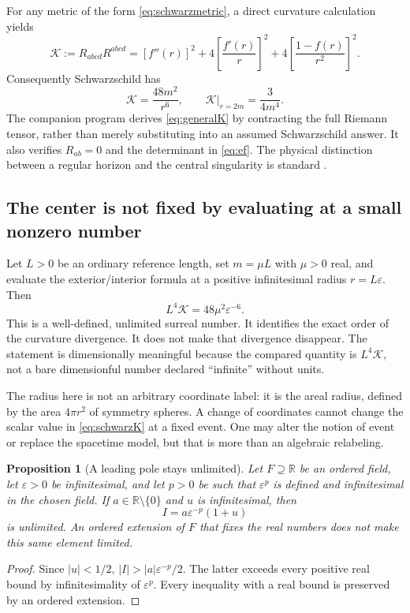 \documentclass[11pt,letterpaper]{article}
\newcommand{\R}{\mathbb{R}}
\newcommand{\eps}{\varepsilon}
\newcommand{\Kretsch}{\mathcal K}
\newtheorem{proposition}{Proposition}[section]
\theoremstyle{definition}
\theoremstyle{remark}
\begin{document}
For any metric of the form \eqref{eq:schwarzmetric}, a direct curvature
calculation yields
\begin{equation}
 \Kretsch:=R_{abcd}R^{abcd}
   =[f''(r)]^2+4\left[\frac{f'(r)}r\right]^2
       +4\left[\frac{1-f(r)}{r^2}\right]^2.
 \label{eq:generalK}
\end{equation}
Consequently Schwarzschild has
\begin{equation}
 \Kretsch=\frac{48m^2}{r^6},
 \qquad \Kretsch\big|_{r=2m}=\frac{3}{4m^4}.
 \label{eq:schwarzK}
\end{equation}
The companion program derives \eqref{eq:generalK} by contracting the full
Riemann tensor, rather than merely substituting into an assumed Schwarzschild
answer. It also verifies $R_{ab}=0$ and the determinant in
\eqref{eq:ef}. The physical distinction between a regular horizon and the
central singularity is standard \cite{Witten}.

\subsection{The center is not fixed by evaluating at a small nonzero number}

Let $L>0$ be an ordinary reference length, set $m=\mu L$ with $\mu>0$ real,
and evaluate the exterior/interior formula at a positive infinitesimal radius
$r=L\eps$. Then
\begin{equation}
 L^4\Kretsch=48\mu^2\eps^{-6}.
 \label{eq:infK}
\end{equation}
This is a well-defined, unlimited surreal number. It identifies the exact
order of the curvature divergence. It does not make that divergence disappear.
The statement is dimensionally meaningful because the compared quantity is
$L^4\Kretsch$, not a bare dimensionful number declared ``infinite'' without
units.

The radius here is not an arbitrary coordinate label: it is the areal radius,
defined by the area $4\pi r^2$ of symmetry spheres. A change of coordinates
cannot change the scalar value in \eqref{eq:schwarzK} at a fixed event.
One may alter the notion of event or replace the spacetime model, but that is
more than an algebraic relabeling.

\begin{proposition}[A leading pole stays unlimited]
\label{prop:pole}
Let $F\supseteq\R$ be an ordered field, let $\eps>0$ be infinitesimal, and let
$p>0$ be such that $\eps^p$ is defined and infinitesimal in the chosen field.
If $a\in\R\setminus\{0\}$ and $u$ is infinitesimal, then
\[
 I=a\eps^{-p}(1+u)
\]
is unlimited. An ordered extension of $F$ that fixes the real numbers does not
make this same element limited.
\end{proposition}
\begin{proof}
Since $|u|<1/2$, $|I|>|a|\eps^{-p}/2$. The latter exceeds every positive real
bound by infinitesimality of $\eps^p$. Every inequality with a real bound is
preserved by an ordered extension.
\end{proof}
\end{document}
